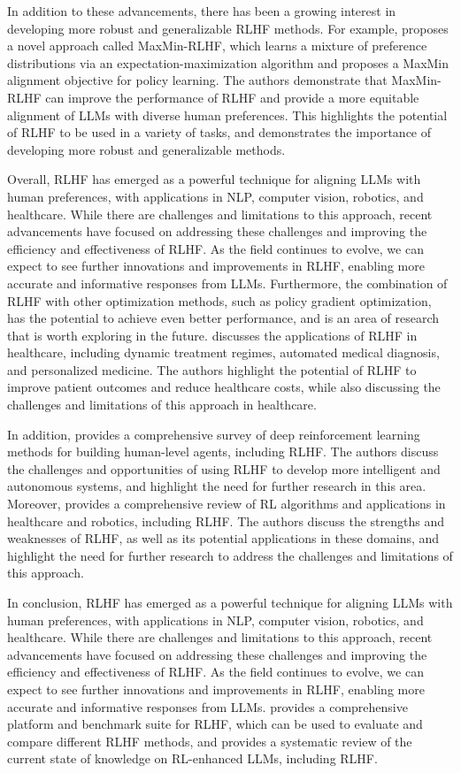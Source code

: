 \documentclass[11pt]{article}
\begin{document}
In addition to these advancements, there has been a growing interest in developing more robust and generalizable RLHF methods. For example, \cite{ref159} proposes a novel approach called MaxMin-RLHF, which learns a mixture of preference distributions via an expectation-maximization algorithm and proposes a MaxMin alignment objective for policy learning. The authors demonstrate that MaxMin-RLHF can improve the performance of RLHF and provide a more equitable alignment of LLMs with diverse human preferences. This highlights the potential of RLHF to be used in a variety of tasks, and demonstrates the importance of developing more robust and generalizable methods.

Overall, RLHF has emerged as a powerful technique for aligning LLMs with human preferences, with applications in NLP, computer vision, robotics, and healthcare. While there are challenges and limitations to this approach, recent advancements have focused on addressing these challenges and improving the efficiency and effectiveness of RLHF. As the field continues to evolve, we can expect to see further innovations and improvements in RLHF, enabling more accurate and informative responses from LLMs. Furthermore, the combination of RLHF with other optimization methods, such as policy gradient optimization, has the potential to achieve even better performance, and is an area of research that is worth exploring in the future. \cite{ref160} discusses the applications of RLHF in healthcare, including dynamic treatment regimes, automated medical diagnosis, and personalized medicine. The authors highlight the potential of RLHF to improve patient outcomes and reduce healthcare costs, while also discussing the challenges and limitations of this approach in healthcare.

In addition, \cite{ref161} provides a comprehensive survey of deep reinforcement learning methods for building human-level agents, including RLHF. The authors discuss the challenges and opportunities of using RLHF to develop more intelligent and autonomous systems, and highlight the need for further research in this area. Moreover, \cite{ref162} provides a comprehensive review of RL algorithms and applications in healthcare and robotics, including RLHF. The authors discuss the strengths and weaknesses of RLHF, as well as its potential applications in these domains, and highlight the need for further research to address the challenges and limitations of this approach.

In conclusion, RLHF has emerged as a powerful technique for aligning LLMs with human preferences, with applications in NLP, computer vision, robotics, and healthcare. While there are challenges and limitations to this approach, recent advancements have focused on addressing these challenges and improving the efficiency and effectiveness of RLHF. As the field continues to evolve, we can expect to see further innovations and improvements in RLHF, enabling more accurate and informative responses from LLMs. \cite{ref163} provides a comprehensive platform and benchmark suite for RLHF, which can be used to evaluate and compare different RLHF methods, and \cite{ref164} provides a systematic review of the current state of knowledge on RL-enhanced LLMs, including RLHF.
\end{document}
